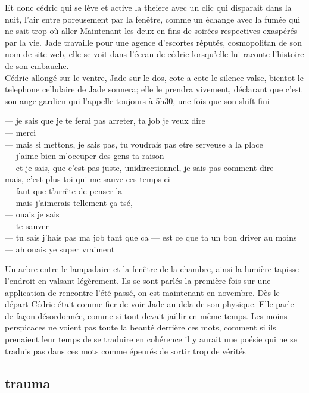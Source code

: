 \documentclass{article}
\begin{document}
Et donc cédric qui se lève et active la theiere avec un clic qui disparait
dans la nuit, l'air entre poreusement par la fenêtre, comme un échange
avec la fumée qui ne sait trop où aller Maintenant les deux en fins de soirées
respectives exaspérés par la vie. Jade travaille pour une agence d'escortes
réputés, cosmopolitan de son nom de site web, elle se voit dans l'écran de
cédric lorsqu'elle lui raconte l'histoire de son embauche.\\

Cédric allongé sur le ventre, Jade sur le dos, cote a cote le silence valse,
bientot le telephone cellulaire de Jade sonnera; elle le prendra vivement,
déclarant que c'est son ange gardien qui l'appelle toujours à 5h30, une fois que
son shift fini


--- je sais que je te ferai pas arreter, ta job je veux dire\\
--- merci\\
--- mais si mettons, je sais pas, tu voudrais pas etre serveuse a la place\\
--- j'aime bien m'occuper des gens ta raison\\
--- et je sais, que c'est pas juste, unidirectionnel, je sais pas comment dire\\
mais, c'est plus toi qui me sauve ces temps ci\\
--- faut que t'arrête de penser la\\
--- mais j'aimerais tellement ça tsé,\\
--- ouais je sais\\
--- te sauver\\
--- tu sais j'hais pas ma job tant que ca
--- est ce que ta un bon driver au moins
--- ah ouais ye super vraiment


Un arbre entre le lampadaire et la fenêtre de la chambre, ainsi la lumière
tapisse l'endroit en valsant légèrement. Ils se sont parlés la première fois sur
une application de rencontre l'été passé, on est maintenant en novembre. Dès le
départ Cédric était comme fier de voir Jade au dela de son physique. Elle parle
de façon désordonnée, comme si tout devait jaillir en même temps. Les moins
perspicaces ne voient pas toute la beauté derrière ces mots, comment si ils
prenaient leur temps de se traduire en cohérence il y aurait une poésie qui ne
se traduis pas dans ces mots comme épeurés de sortir trop de vérités\\


\clearpage
\subsection{trauma}
\end{document}
